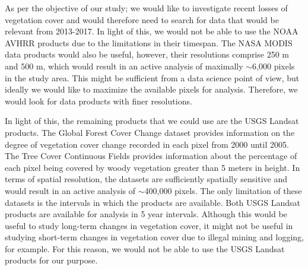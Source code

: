 \justify
As per the objective of our study; we would like to investigate recent losses of vegetation cover and would therefore need to search for data that would be relevant from 2013-2017. In light of this, we would not be able to use the NOAA AVHRR products due to the limitations in their timespan. The NASA MODIS data products would also be useful, however, their resolutions comprise 250 m and 500 m, which would result in an active analysis of maximally $\sim$6,000 pixels in the study area. This might be sufficient from a data science point of view, but ideally we would like to maximize the available pixels for analysis. Therefore, we would look for data products with finer resolutions. 

\justify
In light of this, the remaining products that we could use are the USGS Landsat products. The Global Forest Cover Change dataset provides information on the degree of vegetation cover change recorded in each pixel from 2000 until 2005. The Tree Cover Continuous Fields provides information about the percentage of each pixel being covered by woody vegetation greater than 5 meters in height. In terms of spatial resolution, the datasets are sufficiently spatially sensitive and would result in an active analysis of $\sim$400,000 pixels. The only limitation of these datasets is the intervals in which the products are available. Both USGS Landsat products are available for analysis in 5 year intervals. Although this would be useful to study long-term changes in vegetation cover, it might not be useful in studying short-term changes in vegetation cover due to illegal mining and logging, for example. For this reason, we would not be able to use the USGS Landsat products for our purpose.

